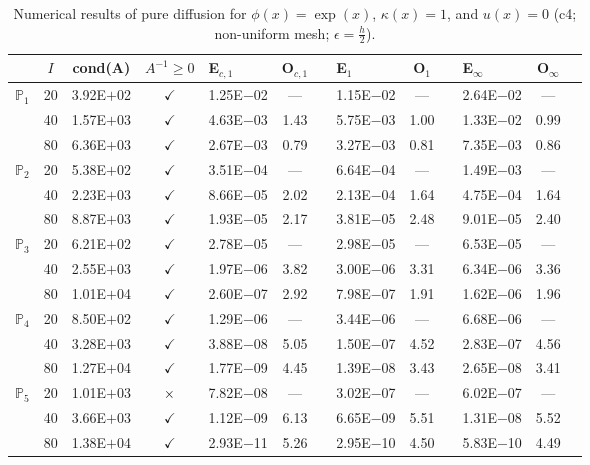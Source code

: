 \begin{table}[H]
\centering
\caption{Numerical results of pure diffusion for $\phi(x)=\exp(x)$, $\kappa(x)=1$, and $u(x)=0$ (c4; non-uniform mesh; $\epsilon=\frac{h}{2}$).}
\begin{tabular}{@{}l c c c l c c l c c l c c@{}}
\toprule
 & $I$ & cond(A) & $A^{-1}\geq 0$ &  E$_{c,1}$ & O$_{c,1}$ && E$_1$ & O$_1$ && E$_{\infty}$ & O$_{\infty}$\\
\midrule
\multirow{3}{*}{$\mathbb{P}_{1}$}
 & 20 & 3.92E$+$02 & $\checkmark$ & 1.25E$-$02 & --- && 1.15E$-$02 & --- && 2.64E$-$02 & ---\\
 & 40 & 1.57E$+$03 & $\checkmark$ & 4.63E$-$03 & 1.43 && 5.75E$-$03 & 1.00 && 1.33E$-$02 & 0.99\\
 & 80 & 6.36E$+$03 & $\checkmark$ & 2.67E$-$03 & 0.79 && 3.27E$-$03 & 0.81 && 7.35E$-$03 & 0.86\\
\midrule
\multirow{3}{*}{$\mathbb{P}_{2}$}
 & 20 & 5.38E$+$02 & $\checkmark$ & 3.51E$-$04 & --- && 6.64E$-$04 & --- && 1.49E$-$03 & ---\\
 & 40 & 2.23E$+$03 & $\checkmark$ & 8.66E$-$05 & 2.02 && 2.13E$-$04 & 1.64 && 4.75E$-$04 & 1.64\\
 & 80 & 8.87E$+$03 & $\checkmark$ & 1.93E$-$05 & 2.17 && 3.81E$-$05 & 2.48 && 9.01E$-$05 & 2.40\\
\midrule
\multirow{3}{*}{$\mathbb{P}_{3}$}
 & 20 & 6.21E$+$02 & $\checkmark$ & 2.78E$-$05 & --- && 2.98E$-$05 & --- && 6.53E$-$05 & ---\\
 & 40 & 2.55E$+$03 & $\checkmark$ & 1.97E$-$06 & 3.82 && 3.00E$-$06 & 3.31 && 6.34E$-$06 & 3.36\\
 & 80 & 1.01E$+$04 & $\checkmark$ & 2.60E$-$07 & 2.92 && 7.98E$-$07 & 1.91 && 1.62E$-$06 & 1.96\\
\midrule
\multirow{3}{*}{$\mathbb{P}_{4}$}
 & 20 & 8.50E$+$02 & $\checkmark$ & 1.29E$-$06 & --- && 3.44E$-$06 & --- && 6.68E$-$06 & ---\\
 & 40 & 3.28E$+$03 & $\checkmark$ & 3.88E$-$08 & 5.05 && 1.50E$-$07 & 4.52 && 2.83E$-$07 & 4.56\\
 & 80 & 1.27E$+$04 & $\checkmark$ & 1.77E$-$09 & 4.45 && 1.39E$-$08 & 3.43 && 2.65E$-$08 & 3.41\\
\midrule
\multirow{3}{*}{$\mathbb{P}_{5}$}
 & 20 & 1.01E$+$03 & $\times$ & 7.82E$-$08 & --- && 3.02E$-$07 & --- && 6.02E$-$07 & ---\\
 & 40 & 3.66E$+$03 & $\checkmark$ & 1.12E$-$09 & 6.13 && 6.65E$-$09 & 5.51 && 1.31E$-$08 & 5.52\\
 & 80 & 1.38E$+$04 & $\checkmark$ & 2.93E$-$11 & 5.26 && 2.95E$-$10 & 4.50 && 5.83E$-$10 & 4.49\\
\bottomrule
\end{tabular}
\end{table}